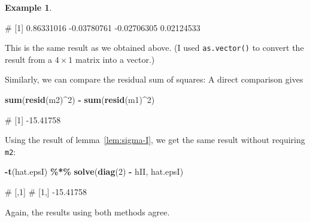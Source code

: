 \documentclass[
  a4paper,
]{article}
\newenvironment{Shaded}{\begin{snugshade}}{\end{snugshade}}
\newcommand{\DecValTok}[1]{\textcolor[rgb]{0.00,0.00,0.81}{#1}}
\newcommand{\FunctionTok}[1]{\textcolor[rgb]{0.13,0.29,0.53}{\textbf{#1}}}
\newcommand{\NormalTok}[1]{#1}
\newcommand{\SpecialCharTok}[1]{\textcolor[rgb]{0.81,0.36,0.00}{\textbf{#1}}}
\theoremstyle{definition}
\theoremstyle{definition}
\newtheorem{example}{Example}[section]
\theoremstyle{definition}
\theoremstyle{definition}
\theoremstyle{remark}
\begin{document}
\begin{example}
\begin{Shaded}
\begin{Highlighting}[]
\NormalTok{\# [1]  0.86331016 {-}0.03780761 {-}0.02706305  0.02124533}
\end{Highlighting}
\end{Shaded}

This is the same result as we obtained above. (I used \texttt{as.vector()} to
convert the result from a \(4\times 1\) matrix into a vector.)

Similarly, we can compare the residual sum of squares:
A direct comparison gives

\begin{Shaded}
\begin{Highlighting}[]
\FunctionTok{sum}\NormalTok{(}\FunctionTok{resid}\NormalTok{(m2)}\SpecialCharTok{\^{}}\DecValTok{2}\NormalTok{) }\SpecialCharTok{{-}} \FunctionTok{sum}\NormalTok{(}\FunctionTok{resid}\NormalTok{(m1)}\SpecialCharTok{\^{}}\DecValTok{2}\NormalTok{)}
\end{Highlighting}
\end{Shaded}

\begin{Shaded}
\begin{Highlighting}[]
\NormalTok{\# [1] {-}15.41758}
\end{Highlighting}
\end{Shaded}

Using the result of lemma~\ref{lem:sigma-I}, we get the same result
without requiring \texttt{m2}:

\begin{Shaded}
\begin{Highlighting}[]
\SpecialCharTok{{-}}\FunctionTok{t}\NormalTok{(hat.epsI) }\SpecialCharTok{\%*\%} \FunctionTok{solve}\NormalTok{(}\FunctionTok{diag}\NormalTok{(}\DecValTok{2}\NormalTok{) }\SpecialCharTok{{-}}\NormalTok{ hII, hat.epsI)}
\end{Highlighting}
\end{Shaded}

\begin{Shaded}
\begin{Highlighting}[]
\NormalTok{\#           [,1]}
\NormalTok{\# [1,] {-}15.41758}
\end{Highlighting}
\end{Shaded}

Again, the results using both methods agree.
\end{example}
\end{document}
